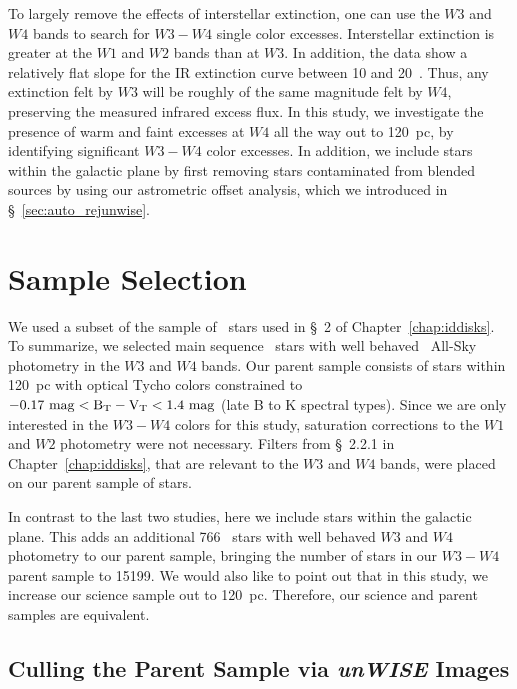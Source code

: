     To largely remove the effects of interstellar extinction, one can use the $W3$ and $W4$ bands to search for $W3-W4$ single color excesses. Interstellar extinction is greater at the $W1$ and $W2$ bands than at $W3$. In addition, the data show a relatively flat slope for the IR extinction curve between 10 and 20\micron\ \citep{Wang2014}. Thus, any extinction felt by $W3$ will be roughly of the same magnitude felt by $W4$, preserving the measured infrared excess flux. In this study, we investigate the presence of warm and faint excesses at $W4$ all the way out to 120~pc, by identifying significant $W3-W4$ color excesses. In addition, we include stars within the galactic plane by first removing stars contaminated from blended sources by using our astrometric offset analysis, which we introduced in \S~\ref{sec:auto_rejunwise}.
    

\section{Sample Selection}

    We used a subset of the sample of \hip\ stars used in \S~2 of Chapter~\ref{chap:iddisks}. To summarize, we selected main sequence \hip\ stars with well behaved \WS\ All-Sky photometry in the $W3$ and $W4$ bands. Our parent sample consists of stars within 120~pc with optical Tycho colors constrained to $-0.17~\rm{mag}< B_T-V_T< 1.4~\rm{mag}$ (late B to K spectral types). Since we are only interested in the $W3-W4$ colors for this study, saturation corrections to the $W1$ and $W2$ photometry were not necessary. Filters from \S~2.2.1 in Chapter~\ref{chap:iddisks}, that are relevant to the $W3$ and $W4$ bands, were placed on our parent sample of stars. 
    
    In contrast to the last two studies, here we include stars within the galactic plane. This adds an additional 766 \hip\ stars with well behaved $W3$ and $W4$ photometry to our parent sample, bringing the number of stars in our $W3-W4$ parent sample to 15199. We would also like to point out that in this study, we increase our science sample out to 120~pc. Therefore, our science and parent samples are equivalent.

   \subsection{Culling the Parent Sample via \textit{unWISE} Images}\label{sec:unwise_reject}
    
